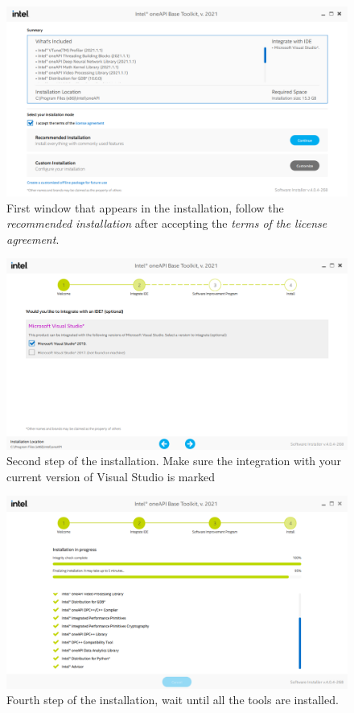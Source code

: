 \begin{figure}
    \centering
    \includegraphics[width= \textwidth]{Figures/Proceso2C}
    \caption{First window that appears in the installation, follow the \textit{recommended installation} after accepting the \textit{terms of the license agreement}.}
    \label{fig:Proceso2C}
\end{figure}

\begin{figure}
    \centering
    \includegraphics[width=\textwidth]{Figures/Proceso2D}
    \caption{Second step of the installation. Make sure the integration with your current version of Visual Studio is marked}
    \label{fig:Proceso2D}
\end{figure}

\begin{figure}
    \centering
    \includegraphics[width= \textwidth]{Figures/Proceso2E}
    \caption{Fourth step of the installation, wait until all the tools are installed.}
    \label{fig:Proceso2E}
\end{figure}



